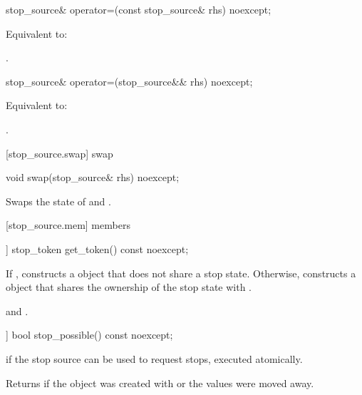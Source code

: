 {%
\begin{itemdecl}
stop_source& operator=(const stop_source& rhs) noexcept;
\end{itemdecl}
\begin{itemdescr}
  \pnum\effects Equivalent to: 

  \pnum\returns {}.
\end{itemdescr}

%
\begin{itemdecl}
stop_source& operator=(stop_source&& rhs) noexcept;
\end{itemdecl}
\begin{itemdescr}
  \pnum\effects Equivalent to: 

  \pnum\returns {}.
\end{itemdescr}

[stop_source.swap]{ swap}

%
\begin{itemdecl}
void swap(stop_source& rhs) noexcept;
\end{itemdecl}

\begin{itemdescr}
 \pnum \effects Swaps the state of  and .
\end{itemdescr}


[stop_source.mem]{ members}

%
\begin{itemdecl}
[[nodiscard]] stop_token get_token() const noexcept;
\end{itemdecl}
\begin{itemdescr}
  \pnum\effects If , constructs a  object
                that does not share a stop state.
                Otherwise, constructs a  object 
                that shares the ownership of the stop state with .

  \pnum\postconditions {}
                and .
\end{itemdescr}


%
\begin{itemdecl}
[[nodiscard]] bool stop_possible() const noexcept;
\end{itemdecl}
\begin{itemdescr}
  \pnum\returns {} if the stop source can be used to request stops, executed atomically.
                \begin{note} Returns  if the object was created with 
                             or the values were moved away.
                             \end{note}
\end{itemdescr}

}

